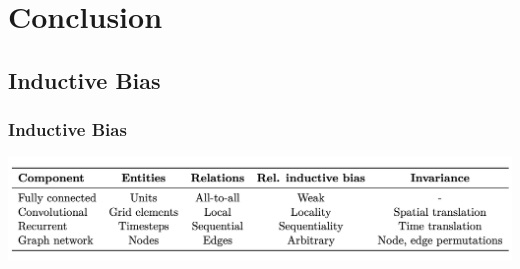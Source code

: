 \documentclass[]{beamer}
\begin{document}
\section{Conclusion}
\subsection{Inductive Bias}
\begin{frame}
    \frametitle{Inductive Bias}
    \includegraphics[scale = 0.25]{inductive-bias.png}
\end{frame}

\begin{frame}
    \printbibliography{}
\end{frame}
\end{document}
